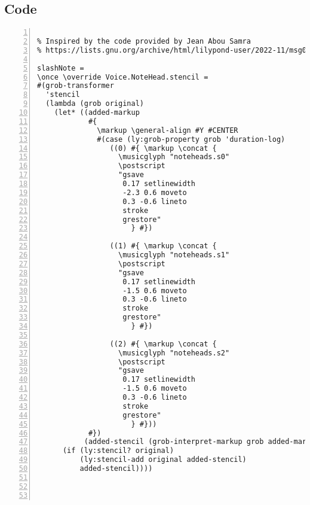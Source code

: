 \subsection{Code}
\begin{Verbatim}[numbers=left,xleftmargin=5mm]

% Inspired by the code provided by Jean Abou Samra
% https://lists.gnu.org/archive/html/lilypond-user/2022-11/msg00333.html

slashNote =
\once \override Voice.NoteHead.stencil =
#(grob-transformer
  'stencil
  (lambda (grob original)
    (let* ((added-markup
            #{
              \markup \general-align #Y #CENTER
              #(case (ly:grob-property grob 'duration-log)
                 ((0) #{ \markup \concat {
                   \musicglyph "noteheads.s0"
                   \postscript
                   "gsave 
                    0.17 setlinewidth 
                    -2.3 0.6 moveto 
                    0.3 -0.6 lineto
                    stroke 
                    grestore"
                      } #})

                 ((1) #{ \markup \concat {
                   \musicglyph "noteheads.s1"
                   \postscript
                   "gsave 
                    0.17 setlinewidth 
                    -1.5 0.6 moveto 
                    0.3 -0.6 lineto
                    stroke 
                    grestore"
                      } #})

                 ((2) #{ \markup \concat {
                   \musicglyph "noteheads.s2"
                   \postscript
                   "gsave 
                    0.17 setlinewidth 
                    -1.5 0.6 moveto 
                    0.3 -0.6 lineto
                    stroke 
                    grestore"
                      } #}))
            #})
           (added-stencil (grob-interpret-markup grob added-markup)))
      (if (ly:stencil? original)
          (ly:stencil-add original added-stencil)
          added-stencil))))




\end{Verbatim}
